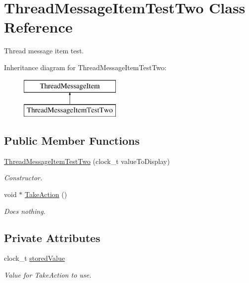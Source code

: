 \hypertarget{class_thread_message_item_test_two}{
\section{ThreadMessageItemTestTwo Class Reference}
\label{class_thread_message_item_test_two}
}


Thread message item test.  


Inheritance diagram for ThreadMessageItemTestTwo:\begin{figure}[H]
\begin{center}
\leavevmode
\includegraphics[height=2.000000cm]{class_thread_message_item_test_two}
\end{center}
\end{figure}
\subsection*{Public Member Functions}
\begin{DoxyCompactItemize}
\item 
\hyperlink{class_thread_message_item_test_two_a88d3231c9c53bf78123a595615668efa}{ThreadMessageItemTestTwo} (clock\_\-t valueToDisplay)
\begin{DoxyCompactList}\small\item\em Constructor. \item\end{DoxyCompactList}\item 
void $\ast$ \hyperlink{class_thread_message_item_test_two_a9f459b59bec0e9a02918c9e2e335ae9f}{TakeAction} ()
\begin{DoxyCompactList}\small\item\em Does nothing. \item\end{DoxyCompactList}\end{DoxyCompactItemize}
\subsection*{Private Attributes}
\begin{DoxyCompactItemize}
\item 
\hypertarget{class_thread_message_item_test_two_ab3fc7310b27023ebe9c35f22c30fcc78}{
clock\_\-t \hyperlink{class_thread_message_item_test_two_ab3fc7310b27023ebe9c35f22c30fcc78}{storedValue}}
\label{class_thread_message_item_test_two_ab3fc7310b27023ebe9c35f22c30fcc78}

\begin{DoxyCompactList}\small\item\em Value for TakeAction to use. \item\end{DoxyCompactList}\end{DoxyCompactItemize}


